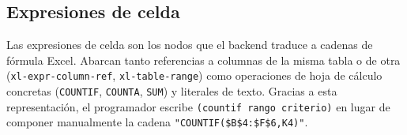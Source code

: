 \documentclass[12pt,a4paper]{report}
\begin{document}
\subsection{Expresiones de celda}
\label{sec:ast-expresiones}

Las expresiones de celda son los nodos que el backend traduce a cadenas de
f\'ormula Excel.  Abarcan tanto referencias a columnas de la misma tabla o
de otra (\texttt{xl-expr-column-ref}, \texttt{xl-table-range}) como
operaciones de hoja de c\'alculo concretas (\texttt{COUNTIF},
\texttt{COUNTA}, \texttt{SUM}) y literales de texto.  Gracias a esta
representaci\'on, el programador escribe \texttt{(countif rango criterio)}
en lugar de componer manualmente la cadena
\texttt{"COUNTIF(\$B\$4:\$F\$6,K4)"}.
\end{document}
